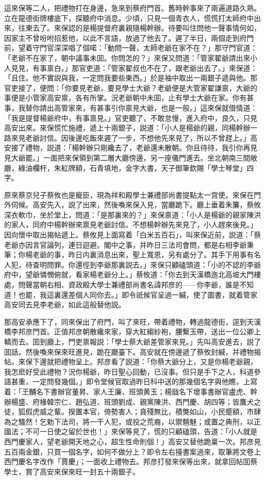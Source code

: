 這來保等二人，把禮物打在身邊，急來到蔡府門首。舊時幹事來了兩遍道路久熟。立在龍德街牌樓底下，探聽府中消息。少頃，只見一個青衣人，慌慌打太師府中出來，往東去了。來保認的是楊提督府裏親隨楊幹辦。待要叫住問他一聲事情何如，因家主不曾吩咐招惹他，以此不言語，放過了他去了。遲了半日，兩個走到府門前，望着守門官深深唱了個喏：「動問一聲，太師老爺在家不在？」那守門官道：「老爺不在家了，朝中議事未囬。你問怎的？」來保又問道：「管家翟爺請出來小人見見，有事禀白。」那官吏道：「管家翟叔也不在了，跟老爺出去了。」來保道：「且住。他不實説與我，一定問我要些東西。」於是袖中取出一兩銀子遞與他。那官吏接了，便問：「你要見老爺，要見學士大爺？老爺便是大管家翟謙禀，大爺的事便是小管家高安禀，各有所掌。況老爺朝中未囬，止有學士大爺在家。你有甚事，我替你請出高管家來，有甚事引你禀見大爺，也是一般。」這來保就借情道：「我是提督楊爺府中，有事禀見。」官吏聽了，不敢怠慢，進入府中，良久，只見高安出來。來保慌忙施禮，遞上十兩銀子，説道：「小人是楊爺的親，同楊幹辦一路來見老爺討信。因後邊吃飯來遲了一步，不想他先來見了，所以不曾趕上。」高安接了禮物，説道：「楊幹辦只剛纔去了，老爺還未散朝。你且待待，我引你再見見大爺罷。」一面把來保領到第二層大廳傍邊，另一座儀門進去。坐北朝南三間敞廳，綠油欄杆，朱紅牌額，石青填地，金字大書，天子御筆欽賜「學士琴堂」四字。

原來蔡京兒子蔡攸也是寵臣，現為祥和殿學士兼禮部尚書提點太一宫使。來保在門外伺候。高安先入，説了出來，然後喚來保入見，當廳跪下。廳上垂着朱簾，蔡攸深衣軟巾，坐於堂上，問道：「是那裏來的？」來保禀道：「小人是楊爺的親家陳洪的家人，同府中楊幹辦來禀見老爺討信。不想楊幹辦先來見了，小人趕來後見。」因向懷中取出揭帖遞上。蔡攸見上面寫着「白米五百石」，叫來保近前，説道：「蔡老爺亦因言官論列，連日迴避。閣中之事，并昨日三法司會問，都是右相李爺秉筆；你楊老爺的事，昨日内裏消息出來，聖上寬恩，另有處分了。其手下用事有名人犯，待查明問罪。你還徑到李爺那裏説去。」來保只顧磕頭道：「小的不認的李爺府中，望爺憐憫俯就，看家楊老爺分上。」蔡攸道：「你去到天漢橋迤北高坡大門樓處，問聲當朝右相、資政殿大學士兼禮部尚書名諱邦彦的——你李爺，誰是不知道！也罷，我這裏還差個人同你去。」即令祇候官呈過一緘，使了圖書，就着管家高安同去見李老爺，如此這般替他説。

那高安承應下了，同來保出了府門，叫了來旺，帶着禮物，轉過龍德街，逕到天漢橋李邦彦門首。正值邦彦朝散纔來家，穿大紅縐紗袍，腰繫玉帶，送出一位公卿上轎而去。囬到廳上，門吏禀報説：「學士蔡大爺差管家來見。」先叫高安進去，説了囬話。然後喚來保來旺進見，跪在廳臺下。高安就在傍邊遞了蔡攸封緘，幷禮物揭帖。來保下邊就把禮物呈上。邦彦看了説道：「你蔡大爺分上，又是你楊老爺親，我怎麽好受此禮物？況你楊爺，昨日聖心回動，已沒事。但只是手下之人，科道參語甚重，一定問發幾個。」即令堂候官取過昨日科中送的那幾個名字與他瞧，上寫着：「王黼名下書辦官董昇、家人王廉、班頭黄玉；楊戩名下壞事書辦官盧虎、幹辦楊盛、府椽韓宗仁、趙弘道、班頭劉成、親黨陳洪、西門慶、胡四等；皆鷹犬之徒，狐假虎威之輩。揆置本官，倚勢害人；貪殘無比，積獘如山，小民蹙額，巿肆為之騷然！乞勅下法司，將一干人犯，或投之荒裔，以禦魑魅；或置之典刑，以正國法；不可一日使之留於世也！」來保等見了，慌的只顧磕頭，告道：「小人就是西門慶家人，望老爺開天地之心，超生性命則個！」高安又替他跪稟一次。邦彦見五百兩金銀，只買一個名字，如何不做分上？即令左右擡書案過來，取筆將文卷上西門慶名字改作「賈慶」；一面收上禮物去。邦彦打發來保等出來，就拿回帖囬蔡學士，賞了高安來保來旺一封五十兩銀子。

